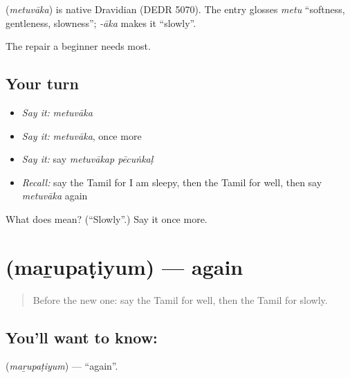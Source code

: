\begin{cousinweb}
\textbf{} (\emph{metuvāka}) is native Dravidian (DEDR 5070). The entry glosses \emph{metu} \textquotedblleft{}softness, gentleness, slowness\textquotedblright{}; \emph{-āka} makes it \textquotedblleft{}slowly\textquotedblright{}.
\end{cousinweb}

\begin{grammarlens}[title={What you've built}]
The repair a beginner needs most.
\end{grammarlens}

\subsection*{Your turn}
\begin{itemize}
\raggedright
  \item \emph{Say it:} \emph{metuvāka}
  \item \emph{Say it:} \emph{metuvāka}, once more
  \item \emph{Say it:} say \emph{metuvākap pēcuṅkaḷ}
  \item \emph{Recall:} say the Tamil for I am sleepy, then the Tamil for well, then say \emph{metuvāka} again
\end{itemize}

\begin{tcolorbox}[breakable,colback=teal!4,colframe=teal!35!black,title={Before you move on}]
What does  mean? (\textquotedblleft{}Slowly\textquotedblright{}.) Say it once more.
\end{tcolorbox}
\section[\texorpdfstring{\ta{மறுபடியும்} (maṟupaṭiyum)}{மறுபடியும் (maṟupaṭiyum)}]{ (maṟupaṭiyum) — again}

\label{lesson:TA-C92-again}



\begin{quote}
Before the new one: say the Tamil for well, then the Tamil for slowly.
\end{quote}

\subsection*{You'll want to know: }
\textbf{} (\emph{maṟupaṭiyum}) — \textquotedblleft{}again\textquotedblright{}.

